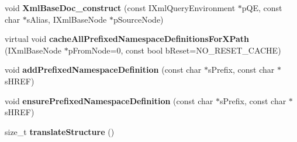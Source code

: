 \begin{DoxyCompactItemize}
\item 
\hypertarget{classgeneral__server_1_1XmlBaseDoc_a1d80ed8c2a620bd02eb47ddd381d3b6f}{void {\bfseries \-Xml\-Base\-Doc\-\_\-construct} (const \-I\-Xml\-Query\-Environment $\ast$p\-Q\-E, const char $\ast$s\-Alias, \-I\-Xml\-Base\-Node $\ast$p\-Source\-Node)}\label{classgeneral__server_1_1XmlBaseDoc_a1d80ed8c2a620bd02eb47ddd381d3b6f}

\item 
\hypertarget{classgeneral__server_1_1XmlBaseDoc_a59cab297e8ec12260f898dded3cf1124}{virtual void {\bfseries cache\-All\-Prefixed\-Namespace\-Definitions\-For\-X\-Path} (\-I\-Xml\-Base\-Node $\ast$p\-From\-Node=0, const bool b\-Reset=\-N\-O\-\_\-\-R\-E\-S\-E\-T\-\_\-\-C\-A\-C\-H\-E)}\label{classgeneral__server_1_1XmlBaseDoc_a59cab297e8ec12260f898dded3cf1124}

\item 
\hypertarget{classgeneral__server_1_1XmlBaseDoc_a8ddbf4db35e6ffaae5070a058ff51452}{void {\bfseries add\-Prefixed\-Namespace\-Definition} (const char $\ast$s\-Prefix, const char $\ast$s\-H\-R\-E\-F)}\label{classgeneral__server_1_1XmlBaseDoc_a8ddbf4db35e6ffaae5070a058ff51452}

\item 
\hypertarget{classgeneral__server_1_1XmlBaseDoc_a791f641afebe7add1a6dc8bf5ad48062}{void {\bfseries ensure\-Prefixed\-Namespace\-Definition} (const char $\ast$s\-Prefix, const char $\ast$s\-H\-R\-E\-F)}\label{classgeneral__server_1_1XmlBaseDoc_a791f641afebe7add1a6dc8bf5ad48062}

\item 
\hypertarget{classgeneral__server_1_1XmlBaseDoc_ab7219738d94a61da1e7c9c2c7cacf982}{size\-\_\-t {\bfseries translate\-Structure} ()}\label{classgeneral__server_1_1XmlBaseDoc_ab7219738d94a61da1e7c9c2c7cacf982}

\end{DoxyCompactItemize}

